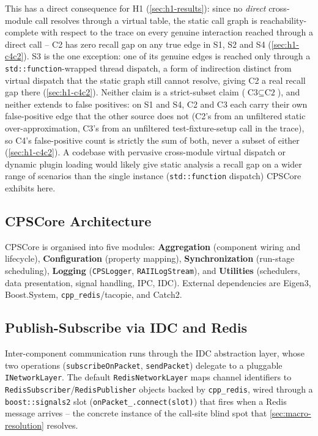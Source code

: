 This has a direct consequence for H1 (\cref{sec:h1-results}): since no
\emph{direct} cross-module call resolves through a virtual table, the
static call graph is reachability-complete with respect to the trace on
every genuine interaction reached through a direct call -- C2 has zero
recall gap on any true edge in S1, S2 and S4 (\cref{sec:h1-c4c2}). S3
is the one exception: one of its genuine edges is reached only through
a \texttt{std::function}-wrapped thread dispatch, a form of indirection
distinct from virtual dispatch that the static graph still cannot
resolve, giving C2 a real recall gap there (\cref{sec:h1-c4c2}). Neither
claim is a strict-subset claim ($\text{C3}\subseteq\text{C2}$), and
neither extends to false positives: on S1 and S4, C2 and C3 each carry
their own false-positive edge that the other source does not (C2's from
an unfiltered static over-approximation, C3's from an unfiltered
test-fixture-setup call in the trace), so C4's false-positive count is
strictly the sum of both, never a subset of either
(\cref{sec:h1-c4c2}). A codebase with pervasive cross-module virtual
dispatch or dynamic plugin loading would likely give static analysis a
recall gap on a wider range of scenarios than the single instance
(\texttt{std::function} dispatch) CPSCore exhibits here.

\subsection{CPSCore Architecture}

CPSCore is organised into five modules: \textbf{Aggregation} (component
wiring and lifecycle), \textbf{Configuration} (property mapping),
\textbf{Synchronization} (run-stage scheduling), \textbf{Logging}
(\texttt{CPSLogger}, \texttt{RAIILogStream}), and \textbf{Utilities}
(schedulers, data presentation, signal handling, \ac{IPC}, IDC).
External dependencies are Eigen3, Boost.System, \texttt{cpp\_redis}/tacopie,
and Catch2.

\subsection{Publish-Subscribe via IDC and Redis}\label{sec:idc}

Inter-component communication runs through the \ac{IDC} abstraction
layer, whose two operations (\texttt{subscribeOnPacket},
\texttt{sendPacket}) delegate to a pluggable \texttt{INetworkLayer}. The
default \texttt{RedisNetworkLayer} maps channel identifiers to
\texttt{RedisSubscriber}/\texttt{RedisPublisher} objects backed by
\texttt{cpp\_redis}, wired through a \texttt{boost::signals2} slot
(\texttt{onPacket\_.connect(slot)}) that fires when a Redis message
arrives -- the concrete instance of the call-site blind spot that
\cref{sec:macro-resolution} resolves.

